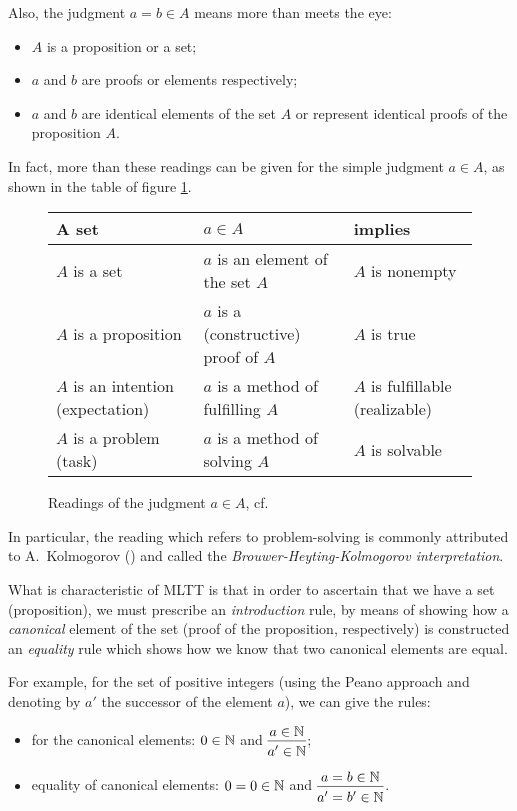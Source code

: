 Also, the judgment $ a = b \in A $ means more than meets the eye:
\begin{itemize}
\item $ A $ is a proposition or a set;
\item $ a $ and $ b $ are proofs or elements respectively;
\item $ a $ and $ b $ are identical elements of the set $ A $ or
  represent identical proofs of the proposition $ A $.
\end{itemize}

In fact, more than these readings can be given for the simple judgment
$ a \in A $, as shown in the table of figure \ref{fig:judge}.

\begin{figure}[!htb]
  \centering
  \begin{tabular}{l | l | l}
    A set & $ a \in A $ & implies \\
    \hline
    $ A $ is a set & $ a $ is an element of the set $ A $ & $ A $ is nonempty \\
    $ A $ is a proposition & $ a $ is a (constructive) proof of  $ A $ & $ A $ is true \\
    $ A $ is an intention (expectation) & $ a $ is a method of fulfilling $ A $ & $ A $ is fulfillable (realizable) \\
    $ A $ is a problem (task) & $ a $ is a method of solving $ A $ & $ A $ is solvable
  \end{tabular}
  \caption{Readings of the judgment $ a \in A $, cf.\ \cite[p.\ 4]{mltt}}
  \label{fig:judge}
\end{figure}

In particular, the reading which refers to problem-solving is commonly attributed to
A.\ Kolmogorov (\cite{kolm}) and called the \emph{Brouwer-Heyting-Kolmogorov interpretation}.

What is characteristic of MLTT is that in order to ascertain that we have a set
(proposition), we must prescribe an \emph{introduction} rule, by means of showing
how a \emph{canonical} element of the set (proof of the proposition, respectively)
is constructed an \emph{equality} rule which shows how we know that two canonical
elements are equal.

For example, for the set of positive integers (using the Peano approach and denoting
by $ a' $ the successor of the element $ a $), we can give the rules:
\begin{itemize}
\item for the canonical elements: $ 0 \in \mathbb{N} $ and %
  $ \begin{prooftree} \hypo{a \in \NN} \infer1{a' \in \NN} \end{prooftree} $;
\item equality of canonical elements: $ 0 = 0 \in \mathbb{N} $ and
  $ \begin{prooftree} \hypo{a = b \in \NN} \infer1{a' = b' \in \NN} \end{prooftree} $.
\end{itemize}

